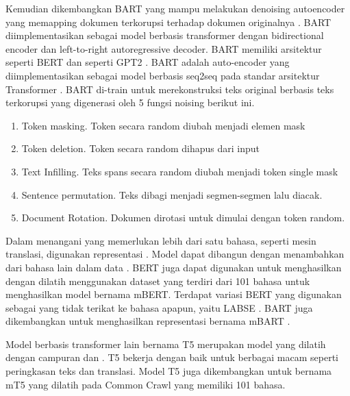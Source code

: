 Kemudian dikembangkan \gls{BART} yang mampu melakukan denoising autoencoder yang memapping dokumen terkorupsi terhadap dokumen originalnya .
\gls{BART} diimplementasikan sebagai model berbasis transformer dengan bidirectional encoder dan left-to-right autoregressive decoder.
\gls{BART} memiliki arsitektur  seperti \gls{BERT}  dan  seperti \gls{GPT2} .
\gls{BART}  adalah auto-encoder yang diimplementasikan sebagai model berbasis \gls{seq2seq} pada standar arsitektur Transformer .
\gls{BART} di-train untuk merekonstruksi teks original berbasis teks terkorupsi yang digenerasi oleh 5 fungsi noising berikut ini.
\begin{enumerate}
  \item Token masking.
  Token secara random diubah menjadi elemen mask
  \item Token deletion.
  Token secara random dihapus dari input
  \item Text Infilling.
  Teks spans secara random diubah menjadi token single mask
  \item Sentence permutation.
  Teks dibagi menjadi segmen-segmen lalu diacak.
  \item Document Rotation.
  Dokumen dirotasi untuk dimulai dengan token random.
\end{enumerate}


Dalam menangani  yang memerlukan lebih dari satu bahasa, seperti mesin translasi, digunakan representasi \mwordem{}.
Model \multil{} dapat dibangun dengan menambahkan  dari bahasa lain dalam data .
\gls{BERT} juga dapat digunakan untuk menghasilkan \mwordem{} dengan dilatih menggunakan dataset yang terdiri dari 101 bahasa untuk menghasilkan \multil{} model bernama mBERT.
Terdapat variasi \gls{BERT} yang digunakan sebagai \mwordem{} yang tidak terikat ke bahasa apapun, yaitu \gls{LABSE} .
\gls{BART} juga dikembangkan untuk menghasilkan representasi \mwordem{} bernama mBART .

Model berbasis transformer lain bernama T5  merupakan model yang dilatih dengan campuran   dan .
T5 bekerja dengan baik untuk berbagai macam  seperti peringkasan teks dan translasi.
Model T5 juga dikembangkan untuk \mwordem{} bernama mT5  yang dilatih pada Common Crawl yang memiliki 101 bahasa.
